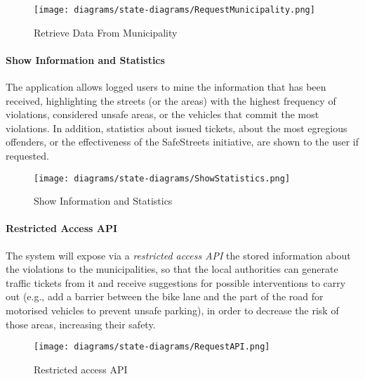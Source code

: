 	\begin{figure}[h]
		\centering
		\texttt{[image: diagrams/state-diagrams/RequestMunicipality.png]}
		\caption{
			\label{fig:retrieveMunicipality} Retrieve Data From Municipality}
	\end{figure}
	
\clearpage

\paragraph{Show Information and Statistics}
The application allows logged users to mine the information that has been received, highlighting the streets (or the areas) with the highest frequency of violations, considered unsafe areas, or the vehicles that commit the most violations. In addition, statistics about issued tickets, about the most egregious offenders, or the effectiveness of the SafeStreets initiative, are shown to the user if requested. \cite{Assignments} \newline
	\begin{figure}[h]
		\centering
		\texttt{[image: diagrams/state-diagrams/ShowStatistics.png]}
		\caption{
			\label{fig:showStatistics} Show Information and Statistics
			}
	\end{figure}
	
\paragraph{Restricted Access API}
The system will expose via a \emph{restricted access API} the stored information about the violations to the municipalities, so that the local authorities can generate traffic tickets from it and receive suggestions for possible interventions to carry out (e.g., add a barrier between the bike lane and the part of the road for motorised vehicles to prevent unsafe parking), in order to decrease the risk of those areas, increasing their safety. \cite{Assignments} \newline
	\begin{figure}[h]
		\centering
		\texttt{[image: diagrams/state-diagrams/RequestAPI.png]}
		\caption{
			\label{fig:restrictedAPI} Restricted access API
		}
	\end{figure}


